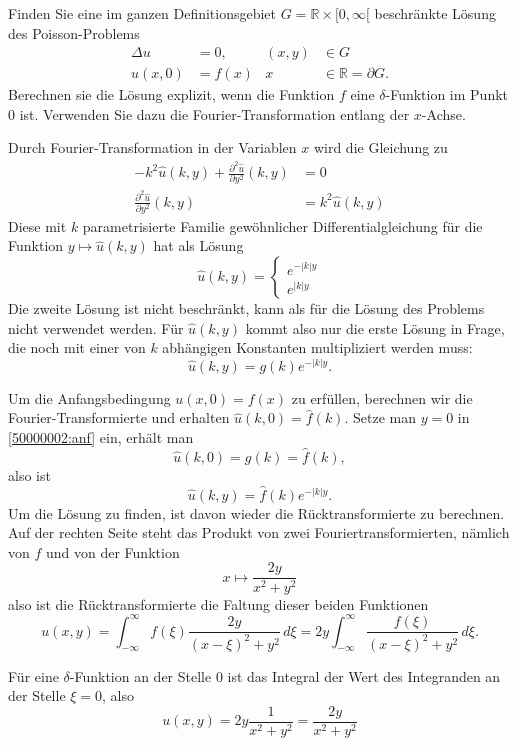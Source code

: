 Finden Sie eine im ganzen Definitionsgebiet 
$G=\mathbb R\times [0,\infty[$
beschränkte Lösung
des Poisson-Problems
\begin{align*}
\Delta u&=0,&(x,y)&\in G
\\
u(x,0)&=f(x)&x&\in\mathbb R=\partial G.
\end{align*}
Berechnen sie die Lösung explizit, wenn die Funktion $f$ eine
$\delta$-Funktion im Punkt $0$ ist. Verwenden Sie dazu die 
Fourier-Transformation entlang der $x$-Achse.

\begin{loesung}
Durch Fourier-Transformation in der Variablen $x$ wird die Gleichung
zu
\begin{align*}
-k^2\hat u(k,y)+\frac{\partial^2\hat u}{\partial y^2}(k,y)&=0\\
\frac{\partial^2\hat u}{\partial y^2}(k,y)&= k^2\hat u(k,y)
\end{align*}
Diese mit $k$ parametrisierte Familie gewöhnlicher Differentialgleichung
für die Funktion
$y\mapsto \hat u(k,y)$ hat als Lösung
\[
\hat u(k,y)=\begin{cases}
e^{-|k|y}\\
e^{|k|y}
\end{cases}
\]
Die zweite Lösung ist nicht beschränkt, kann als für die Lösung
des Problems nicht verwendet werden. Für $\hat u(k,y)$ kommt also
nur die erste Lösung in Frage, die noch mit einer von $k$ abhängigen
Konstanten multipliziert werden muss:
\begin{equation}
\hat u(k,y)=g(k)e^{-|k|y}.
\label{50000002:anf}
\end{equation}

Um die Anfangsbedingung $u(x,0)=f(x)$ zu erfüllen, berechnen wir
die Fourier-Trans\-for\-mier\-te und erhalten $\hat u(k,0)=\hat f(k)$.
Setze man $y=0$ in \eqref{50000002:anf} ein, erhält man
\[
\hat u(k,0)=g(k)=\hat f(k),
\]
also ist 
\[
\hat u(k,y)=\hat f(k)e^{-|k|y}.
\]
Um die Lösung zu finden, ist davon wieder die Rücktransformierte
zu berechnen. Auf der rechten Seite steht das Produkt von zwei
Fouriertransformierten, nämlich von $f$ und von der Funktion
\[
x\mapsto \frac{2y}{x^2+y^2}
\]
also ist die Rücktransformierte die Faltung dieser beiden
Funktionen
\[
u(x,y)=\int_{-\infty}^\infty 
f(\xi) 
\frac{2y}{(x-\xi)^2+y^2}
\,d\xi
=
2y\int_{-\infty}^\infty\frac{f(\xi)}{(x-\xi)^2+y^2}\,d\xi.
\]

Für eine $\delta$-Funktion an der Stelle $0$ ist das Integral der
Wert des Integranden an der Stelle $\xi=0$, also
\[
u(x,y)=2y\frac{1}{x^2+y^2}=\frac{2y}{x^2+y^2}
\]


\end{loesung}
